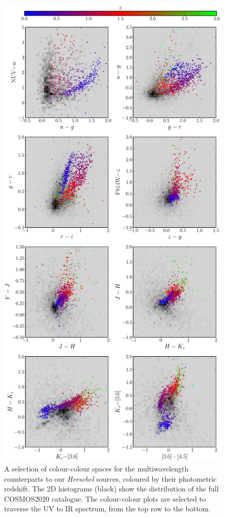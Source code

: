 \begin{figure}
	\centering
	\includegraphics[width=0.85\columnwidth, height=0.9\textheight]{Figures/smg_colours.pdf}
	\caption[Selection of colour-colour diagrams]{A selection of colour-colour spaces for the multiwavelength counterparts to our \textit{Herschel} sources, coloured by their photometric redshift. The 2D histograms (black) show the distribution of the full COSMOS2020 catalogue. The colour-colour plots are selected to traverse the UV to IR spectrum, from the top row to the bottom.}
	\label{fig:smg_colours}
\end{figure}

